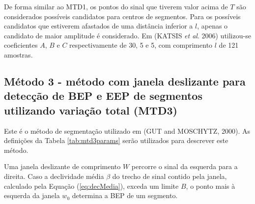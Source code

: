 

De forma similar ao MTD1, os pontos do sinal que tiverem valor acima de $T$ são considerados possíveis candidatos para centros de segmentos. Para os possíveis candidatos que estiverem afastados de uma distância inferior a $l$, apenas o candidato de maior amplitude é considerado. Em (KATSIS \emph{et al}. 2006) utilizou-se coeficientes $A$, $B$ e $C$ respectivamente de 30, 5 e 5, com comprimento $l$ de 121 amostras.

\subsection{Método 3 - método com janela deslizante para detecção de BEP e EEP de segmentos utilizando variação total (MTD3)}

	Este é o método de segmentação utilizado em (GUT and MOSCHYTZ, 2000). As definições da Tabela \ref{tab:mtd3params} serão utilizados para descrever este método.
	
\begin{table}[htb]
\end{table}

Uma janela deslizante de comprimento $W$ percorre o sinal da esquerda para a direita. Caso a declividade média $\beta$ do trecho de sinal contido pela janela, calculado pela Equação (\ref{eq:decMedia}), exceda um limite $B$, o ponto mais à esquerda da janela $w_0$ determina a BEP de um segmento.

